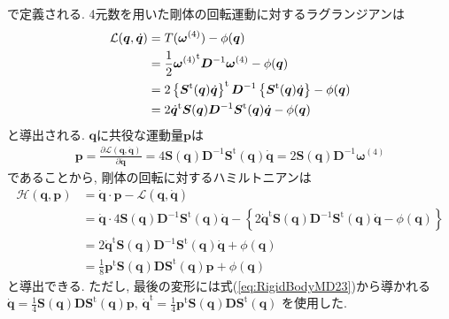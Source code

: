 で定義される. 4元数を用いた剛体の回転運動に対するラグランジアンは
\begin{align}
 \mathcal{L}(\bm{q},\dot{\bm{q}})
 &=
 T(\bm{\omega}^{(4)}) - \phi(\bm{q})
 \notag
 \\
 &=
 \frac{1}{2} {\bm{\omega}^{(4)}}^{\mathrm{t}} \bm{D}^{-1} \bm{\omega}^{(4)} - \phi(\bm{q})
 \notag
 \\
 &=
 2 \left\{
         \bm{S}^{\mathrm{t}} (\bm{q}) \dot{\bm{q}}
 \right\}^{\mathrm{t}}
 \bm{D}^{-1}
 \left\{
        \bm{S}^{\mathrm{t}}(\bm{q}) \dot{\bm{q}}
 \right\}
 - \phi(\bm{q})
 \notag
 \\
 &=
 2 \dot{\bm{q}}^{\mathrm{t}} \bm{S}(\bm{q})
 \bm{D}^{-1}
 \bm{S}^{\mathrm{t}}(\bm{q}) \dot{\bm{q}}
 - \phi(\bm{q})
\label{eq:RigidBodyMD22}
\end{align}
と導出される. 
$\bm{q}$に共役な運動量$\bm{p}$は
\begin{align}
 \bm{p}
 =
 \frac{\partial \mathcal{L}(\bm{q},\dot{\bm{q}})}{\partial \dot{\bm{q}}}
 =
 4 \bm{S}(\bm{q}) \bm{D}^{-1}
 \bm{S}^{\mathrm{t}}(\bm{q})
 \dot{\bm{q}}
 =
 2 \bm{S}(\bm{q}) \bm{D}^{-1} \bm{\omega}^{(4)}
\label{eq:RigidBodyMD23}
\end{align}
であることから, 剛体の回転に対するハミルトニアンは
\begin{align}
 \mathcal{H}(\bm{q},\bm{p})
 &=
 \dot{\bm{q}} \cdot \bm{p} - \mathcal{L}(\bm{q},\dot{\bm{q}})
 \\
 &=
 \dot{\bm{q}} \cdot
  4 \bm{S}(\bm{q}) \bm{D}^{-1} \bm{S}^{\mathrm{t}}(\bm{q})
 \dot{\bm{q}}
 - \left\{
 2 \dot{\bm{q}}^{\mathrm{t}} \bm{S}(\bm{q}) \bm{D}^{-1}
 \bm{S}^{\mathrm{t}}(\bm{q}) \dot{\bm{q}}
 - \phi(\bm{q})
 \right\}
 \\
 &=
 2 \dot{\bm{q}}^{\mathrm{t}} \bm{S}(\bm{q}) \bm{D}^{-1}
 \bm{S}^{\mathrm{t}}(\bm{q}) \dot{\bm{q}}
 + \phi(\bm{q})
 \\
 &=
 \frac{1}{8}
 \bm{p}^{\mathrm{t}} \bm{S}(\bm{q}) \bm{D}
 \bm{S}^{\mathrm{t}} (\bm{q}) \bm{p}
 + \phi(\bm{q})
\label{eq:RigidBodyMD24}
\end{align}
と導出できる. ただし, 最後の変形には式(\ref{eq:RigidBodyMD23})から導かれる
$\dot{\bm{q}}
 = \frac{1}{4} \bm{S}(\bm{q}) \bm{D}
 \bm{S}^{\mathrm{t}} (\bm{q}) \bm{p}$, 
$\dot{\bm{q}}^{\mathrm{t}}
 = \frac{1}{4} \bm{p}^{\mathrm{t}} \bm{S}(\bm{q})
 \bm{D} \bm{S}^{\mathrm{t}} (\bm{q})$
を使用した. 

